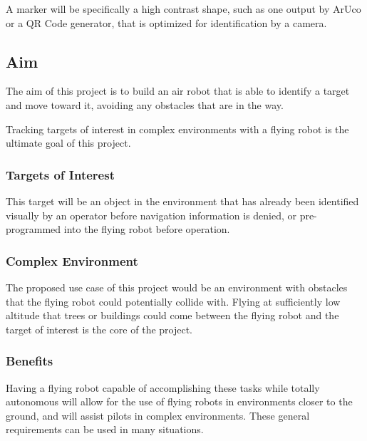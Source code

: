 \documentclass{article}
\begin{document}
		A marker will be specifically a high contrast shape, such as one output by ArUco or a QR Code generator, that is optimized for identification by a camera.
		
	\subsection{Aim}
	
	The aim of this project is to build an air robot that is able to identify a target and move toward it, avoiding any obstacles that are in the way. 
	
	Tracking targets of interest in complex environments with a flying robot is the ultimate goal of this project. 
	
		\subsubsection{Targets of Interest}
		
		This target will be an object in the environment that has already been identified visually by an operator before navigation information is denied, or pre-programmed into the flying robot before operation.
		
		\subsubsection{Complex Environment}
		
		The proposed use case of this project would be an environment with obstacles that the flying robot could potentially collide with. Flying at sufficiently low altitude that trees or buildings could come between the flying robot and the target of interest is the core of the project.
		
		\subsubsection{Benefits}
		
		Having a flying robot capable of accomplishing these tasks while totally autonomous will allow for the use of flying robots in environments closer to the ground, and will assist pilots in complex environments. These general requirements can be used in many situations.
		
\end{document}
